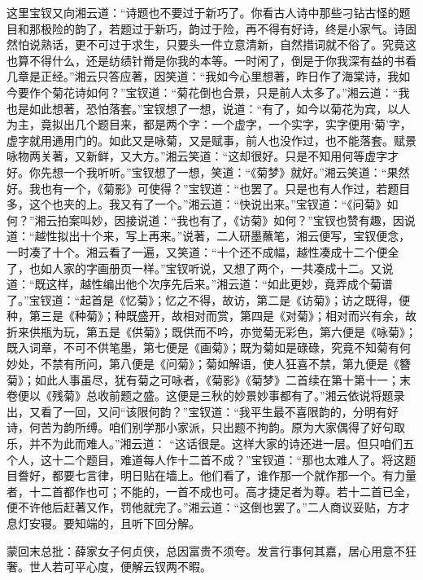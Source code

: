 \begin{parag}
    这里宝钗又向湘云道：“诗题也不要过于新巧了。你看古人诗中那些刁钻古怪的题目和那极险的韵了，若题过于新巧，韵过于险，再不得有好诗，终是小家气。诗固然怕说熟话，更不可过于求生，只要头一件立意清新，自然措词就不俗了。究竟这也算不得什么，还是纺绩针黹是你我的本等。一时闲了，倒是于你我深有益的书看几章是正经。”湘云只答应著，因笑道：“我如今心里想著，昨日作了海棠诗，我如今要作个菊花诗如何？”宝钗道：“菊花倒也合景，只是前人太多了。”湘云道：“我也是如此想著，恐怕落套。”宝钗想了一想，说道：“有了，如今以菊花为宾，以人为主，竟拟出几个题目来，都是两个字：一个虚字，一个实字，实字便用‘菊’字，虚字就用通用门的。如此又是咏菊，又是赋事，前人也没作过，也不能落套。赋景咏物两关著，又新鲜，又大方。”湘云笑道：“这却很好。只是不知用何等虚字才好。你先想一个我听听。”宝钗想了一想，笑道：“《菊梦》就好。”湘云笑道：“果然好。我也有一个，《菊影》可使得？”宝钗道：“也罢了。只是也有人作过，若题目多，这个也夹的上。我又有了一个。”湘云道：“快说出来。”宝钗道：“《问菊》如何？”湘云拍案叫妙，因接说道：“我也有了，《访菊》如何？”宝钗也赞有趣，因说道：“越性拟出十个来，写上再来。”说著，二人研墨蘸笔，湘云便写，宝钗便念，一时凑了十个。湘云看了一遍，又笑道：“十个还不成幅，越性凑成十二个便全了，也如人家的字画册页一样。”宝钗听说，又想了两个，一共凑成十二。又说道：“既这样，越性编出他个次序先后来。”湘云道：“如此更妙，竟弄成个菊谱了。”宝钗道：“起首是《忆菊》；忆之不得，故访，第二是《访菊》；访之既得，便种，第三是《种菊》；种既盛开，故相对而赏，第四是《对菊》；相对而兴有余，故折来供瓶为玩，第五是《供菊》；既供而不吟，亦觉菊无彩色，第六便是《咏菊》；既入词章，不可不供笔墨，第七便是《画菊》；既为菊如是碌碌，究竟不知菊有何妙处，不禁有所问，第八便是《问菊》；菊如解语，使人狂喜不禁，第九便是《簪菊》；如此人事虽尽，犹有菊之可咏者，《菊影》《菊梦》二首续在第十第十一；末卷便以《残菊》总收前题之盛。这便是三秋的妙景妙事都有了。”湘云依说将题录出，又看了一回，又问“该限何韵？”宝钗道：“我平生最不喜限韵的，分明有好诗，何苦为韵所缚。咱们别学那小家派，只出题不拘韵。原为大家偶得了好句取乐，并不为此而难人。”湘云道： “这话很是。这样大家的诗还进一层。但只咱们五个人，这十二个题目，难道每人作十二首不成？”宝钗道：“那也太难人了。将这题目誊好，都要七言律，明日贴在墙上。他们看了，谁作那一个就作那一个。有力量者，十二首都作也可；不能的，一首不成也可。高才捷足者为尊。若十二首已全，便不许他后赶著又作，罚他就完了。”湘云道：“这倒也罢了。”二人商议妥贴，方才息灯安寝。要知端的，且听下回分解。
\end{parag}


\begin{parag}
    \begin{note}蒙回末总批：薛家女子何贞侠，总因富贵不须夸。发言行事何其嘉，居心用意不狂奢。世人若可平心度，便解云钗两不暇。\end{note}
\end{parag}

